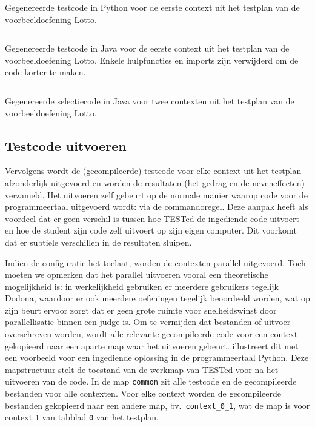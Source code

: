 \begin{listing}
    \inputminted{python}{code/generated-context-1.py}
    \caption{
        Gegenereerde testcode in Python voor de eerste context uit het testplan van de voorbeeldoefening Lotto.
    }
    \label{lst:generated-context-python}
\end{listing}

\begin{listing}
    \inputminted{java}{code/generated-context-1.java}
    \caption{
        Gegenereerde testcode in Java voor de eerste context uit het testplan van de voorbeeldoefening Lotto.
        Enkele hulpfuncties en imports zijn verwijderd om de code korter te maken.
    }
    \label{lst:generated-context-java}
\end{listing}

\begin{listing}
    \inputminted{java}{code/Selector.java}
    \caption{
        Gegenereerde selectiecode in Java voor twee contexten uit het testplan van de voorbeeldoefening Lotto.
    }
    \label{lst:selector-java}
\end{listing}

\subsection{Testcode uitvoeren}\label{subsec:testcode-uitvoeren}

Vervolgens wordt de (gecompileerde) testcode voor elke context uit het testplan afzonderlijk uitgevoerd en worden de resultaten (het gedrag en de neveneffecten) verzameld.
Het uitvoeren zelf gebeurt op de normale manier waarop code voor de programmeertaal uitgevoerd wordt: via de commandoregel.
Deze aanpak heeft als voordeel dat er geen verschil is tussen hoe TESTed de ingediende code uitvoert en hoe de student zijn code zelf uitvoert op zijn eigen computer.
Dit voorkomt dat er subtiele verschillen in de resultaten sluipen.

Indien de configuratie het toelaat, worden de contexten parallel uitgevoerd.
Toch moeten we opmerken dat het parallel uitvoeren vooral een theoretische mogelijkheid is: in werkelijkheid gebruiken er meerdere gebruikers tegelijk Dodona, waardoor er ook meerdere oefeningen tegelijk beoordeeld worden, wat op zijn beurt ervoor zorgt dat er geen grote ruimte voor snelheidswinst door parallellisatie binnen een judge is.
Om te vermijden dat bestanden of uitvoer overschreven worden, wordt alle relevante gecompileerde code voor een context gekopieerd naar een aparte map waar het uitvoeren gebeurt.
 illustreert dit met een voorbeeld voor een ingediende oplossing in de programmeertaal Python.
Deze mapstructuur stelt de toestand van de werkmap van TESTed voor na het uitvoeren van de code.
In de map \texttt{common} zit alle testcode en de gecompileerde bestanden voor alle contexten.
Voor elke context worden de gecompileerde bestanden gekopieerd naar een andere map, bv.\ \texttt{context\_0\_1}, wat de map is voor context \texttt{1} van tabblad \texttt{0} van het testplan.

